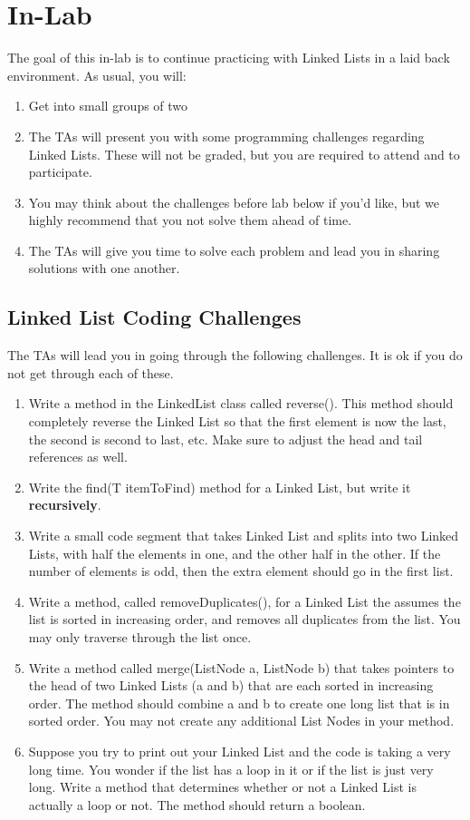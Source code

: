 \documentclass[paper=a4, fontsize=11pt, parskip=full]{scrartcl} %
\numberwithin{equation}{section} %
\numberwithin{figure}{section} %
\numberwithin{table}{section} %
\begin{document}
\section{In-Lab}

The goal of this in-lab is to continue practicing with Linked Lists in a laid back environment. As usual, you will:

\begin{enumerate}
	\item Get into small groups of two
	\item The TAs will present you with some programming challenges regarding Linked Lists. These will not be graded, but you are required to attend and to participate.
	\item You may think about the challenges before lab below if you'd like, but we highly recommend that you not solve them ahead of time.
	\item The TAs will give you time to solve each problem and lead you in sharing solutions with one another.
\end{enumerate}

\subsection{Linked List Coding Challenges}

The TAs will lead you in going through the following challenges. It is ok if you do not get through each of these.

\begin{enumerate}
	\item Write a method in the LinkedList class called reverse(). This method should completely reverse the Linked List so that the first element is now the last, the second is second to last, etc. Make sure to adjust the head and tail references as well.
	\item Write the find(T itemToFind) method for a Linked List, but write it \textbf{recursively}.
	\item Write a small code segment that takes Linked List and splits into two Linked Lists, with half the elements in one, and the other half in the other. If the number of elements is odd, then the extra element should go in the first list.
	\item Write a method, called removeDuplicates(), for a Linked List the assumes the list is sorted in increasing order, and removes all duplicates from the list. You may only traverse through the list once.
	\item Write a method called merge(ListNode a, ListNode b) that takes pointers to the head of two Linked Lists (a and b) that are each sorted in increasing order. The method should combine a and b to create one long list that is in sorted order. You may not create any additional List Nodes in your method.
	\item Suppose you try to print out your Linked List and the code is taking a very long time. You wonder if the list has a loop in it or if the list is just very long. Write a method that determines whether or not a Linked List is actually a loop or not. The method should return a boolean.


\end{enumerate}
\end{document}
